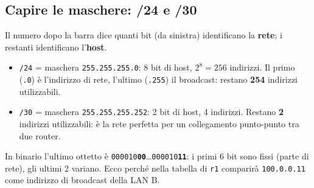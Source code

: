 \subsection{Capire le maschere: /24 e /30}
\begin{tecnica}
Il numero dopo la barra dice quanti bit (da sinistra) identificano la \textbf{rete}; i restanti identificano l'\textbf{host}.
\begin{itemize}
  \item \texttt{/24} = maschera \texttt{255.255.255.0}: 8 bit di host, $2^8=256$ indirizzi. Il primo (\texttt{.0}) è l'indirizzo di rete, l'ultimo (\texttt{.255}) il broadcast: restano \textbf{254} indirizzi utilizzabili.
  \item \texttt{/30} = maschera \texttt{255.255.255.252}: 2 bit di host, 4 indirizzi. Restano \textbf{2} indirizzi utilizzabili: è la rete perfetta per un collegamento punto-punto tra due router.
\end{itemize}
\end{tecnica}
\begin{esempio}[La LAN B: 100.0.0.8/30]
\begin{center}
\end{center}
In binario l'ultimo ottetto è \texttt{000010\textbf{00}}…\texttt{000010\textbf{11}}: i primi 6 bit sono fissi (parte di rete), gli ultimi 2 variano. Ecco perché nella tabella di \texttt{r1} comparirà \texttt{100.0.0.11} come indirizzo di broadcast della LAN B.
\end{esempio}

